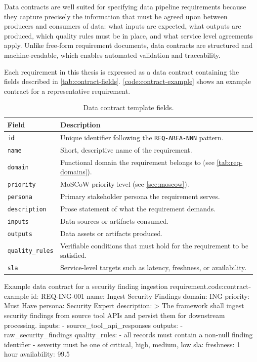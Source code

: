 Data contracts are well suited for specifying data pipeline requirements because they capture precisely the information that must be agreed upon between producers and consumers of data: what inputs are expected, what outputs are produced, which quality rules must be in place, and what service level agreements apply. Unlike free-form requirement documents, data contracts are structured and machine-readable, which enables automated validation and traceability.

Each requirement in this thesis is expressed as a data contract containing the fields described in \autoref{tab:contract-fields}. \autoref{code:contract-example} shows an example contract for a representative requirement.

\begin{table}[ht]
\centering
\caption{Data contract template fields.}
\label{tab:contract-fields}
\begin{tabular}{l p{9cm}}
\hline
\textbf{Field} & \textbf{Description} \\
\hline
\texttt{id} & Unique identifier following the \texttt{REQ-AREA-NNN} pattern. \\
\texttt{name} & Short, descriptive name of the requirement. \\
\texttt{domain} & Functional domain the requirement belongs to (see \autoref{tab:req-domains}). \\
\texttt{priority} & MoSCoW priority level (see \autoref{sec:moscow}). \\
\texttt{persona} & Primary stakeholder persona the requirement serves. \\
\texttt{description} & Prose statement of what the requirement demands. \\
\texttt{inputs} & Data sources or artifacts consumed. \\
\texttt{outputs} & Data assets or artifacts produced. \\
\texttt{quality\_rules} & Verifiable conditions that must hold for the requirement to be satisfied. \\
\texttt{sla} & Service-level targets such as latency, freshness, or availability. \\
\hline
\end{tabular}
\end{table}

\begin{code}{}{Example data contract for a security finding ingestion requirement.}{code:contract-example}
id: REQ-ING-001
name: Ingest Security Findings
domain: ING
priority: Must Have
persona: Security Expert
description: >
  The framework shall ingest security findings from
  source tool APIs and persist them for downstream
  processing.
inputs:
  - source_tool_api_responses
outputs:
  - raw_security_findings
quality_rules:
  - all records must contain a non-null finding identifier
  - severity must be one of critical, high, medium, low
sla:
  freshness: 1 hour
  availability: 99.5%
\end{code}


